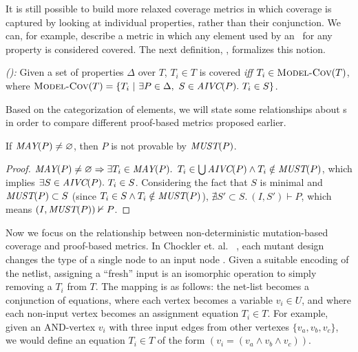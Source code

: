 It is still possible to build more relaxed coverage metrics in which coverage
is captured by looking at individual properties, rather than their conjunction.
We can, for example, describe a metric in which any element used by an \mivc ~for any property is considered covered.
%
The next definition, \allcov, formalizes this notion.
\begin{definition} {\emph{(\allcov):}}
  \label{def:comp-2}
     Given a set of properties $\Delta$ over $T$, $T_i \in T$ is covered
   \emph{iff} $T_i \in \text{\sc Model-Cov} (T)$, where
   $\text{\sc Model-Cov} (T) = \{T_i ~|~ \exists P \in \Delta ,~ S \in \textit{AIVC}(P).~T_i \in S \}$.
\end{definition}

Based on the categorization of elements, we will state some relationships about \mivc s in order to compare different proof-based metrics proposed earlier.

\begin{lemma}
  \label{lem:must-not-enough}
  If $\textit{MAY}(P) \neq \varnothing$, then $P$ is not provable by $\textit{MUST}(P)$.
\end{lemma}
\begin{proof}
  $\textit{MAY}(P) \neq \varnothing \Rightarrow  \exists T_i \in \textit{MAY}(P).$
$T_i \in \bigcup \textit{AIVC}(P) \wedge T_i \notin \textit{MUST}(P)$,
which implies $\exists S \in \textit{AIVC}(P).~ T_i \in S$.
Considering the fact that $S$ is minimal and
$\textit{MUST}(P) \subset S$ (since $T_i \in S \wedge T_i \notin \textit{MUST}(P)$),
 $\nexists S' \subset S.~ (I,S') \vdash P$,  which means $(I, \textit{MUST}(P)) \nvdash P$.
\end{proof}
\vspace{2mm}


Now we focus on the relationship between non-deterministic mutation-based coverage and proof-based metrics. In Chockler et. al.
~\cite{chockler2010coverage},
each mutant design changes the type of a single node to an input node .
Given a suitable encoding of the netlist, assigning a ``fresh'' input is an isomorphic operation to simply removing a $T_i$ from $T$. The mapping is as follows: the net-list becomes a conjunction
of equations, where each vertex becomes a variable $v_i \in U$, and where each non-input vertex becomes an assignment equation $T_i \in T$.
For example, given an AND-vertex $v_i$ with three input edges from other vertexes $\{v_a, v_b, v_c\}$, we would define an equation $T_i \in T$ of the form $(v_i = (v_a \wedge v_b \wedge v_c))$.
%

